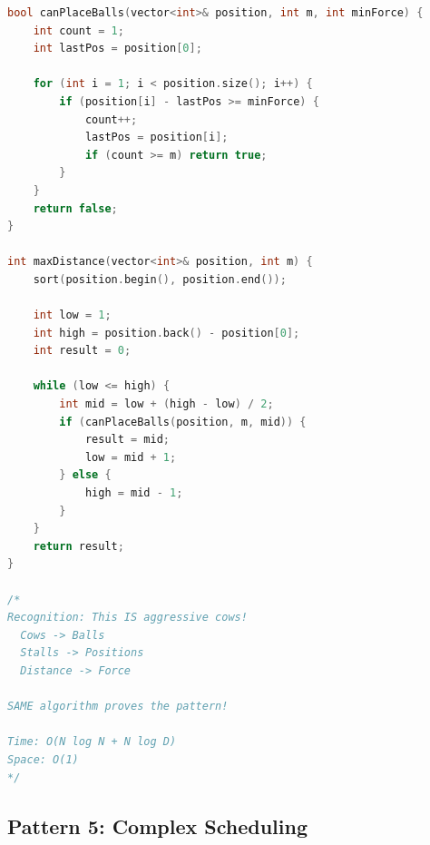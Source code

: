 \documentclass[11pt,a4paper,oneside]{book}
\begin{document}
\begin{lstlisting}[language=C++, caption=Complete Maximize Minimum Solutions]
bool canPlaceBalls(vector<int>& position, int m, int minForce) {
    int count = 1;
    int lastPos = position[0];
    
    for (int i = 1; i < position.size(); i++) {
        if (position[i] - lastPos >= minForce) {
            count++;
            lastPos = position[i];
            if (count >= m) return true;
        }
    }
    return false;
}

int maxDistance(vector<int>& position, int m) {
    sort(position.begin(), position.end());
    
    int low = 1;
    int high = position.back() - position[0];
    int result = 0;
    
    while (low <= high) {
        int mid = low + (high - low) / 2;
        if (canPlaceBalls(position, m, mid)) {
            result = mid;
            low = mid + 1;
        } else {
            high = mid - 1;
        }
    }
    return result;
}

/*
Recognition: This IS aggressive cows!
  Cows -> Balls
  Stalls -> Positions
  Distance -> Force

SAME algorithm proves the pattern!

Time: O(N log N + N log D)
Space: O(1)
*/
\end{lstlisting}

\subsection{Pattern 5: Complex Scheduling}
\end{document}
